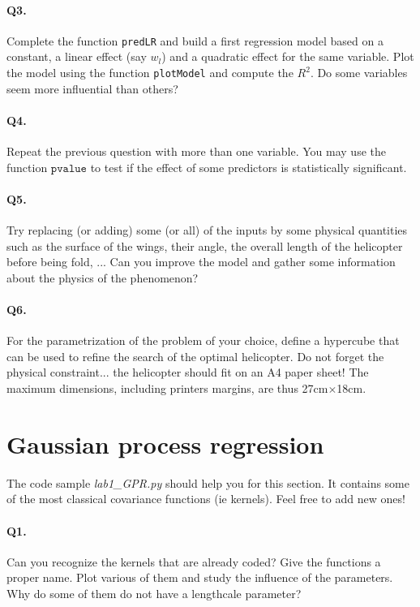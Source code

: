 \documentclass[12pt]{scrartcl}
\begin{document}
\paragraph{Q3.} Complete the function \texttt{predLR} and build a first regression model based on a constant, a linear effect (say $w_l$) and a quadratic effect for the same variable. Plot the model using the function \texttt{plotModel} and compute the $R^2$. Do some variables seem more influential than others?

\paragraph{Q4.} Repeat the previous question with more than one variable. You may use the function $\texttt{pvalue}$ to test if the effect of some predictors is statistically significant.

\paragraph{Q5.} Try replacing (or adding) some (or all) of the inputs by some physical quantities such as the surface of the wings, their angle, the overall length of the helicopter before being fold, ... Can you improve the model and gather some information about the physics of the phenomenon?

\paragraph{Q6.} For the parametrization of the problem of your choice, define a hypercube that can be used to refine the search of the optimal helicopter. Do not forget the physical constraint... the helicopter should fit on an A4 paper sheet! The maximum dimensions, including printers margins, are thus 27cm$\times$18cm.

\section{Gaussian process regression}
The code sample \emph{lab1\_GPR.py} should help you for this section. It contains some of the most classical covariance functions (ie kernels). Feel free to add new ones!

\paragraph{Q1.} Can you recognize the kernels that are already coded? Give the functions a proper name. Plot various of them and study the influence of the parameters. Why do some of them do not have a lengthcale parameter?
\end{document}
